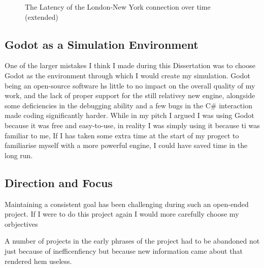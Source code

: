\documentclass[12pt]{article}
\begin{document}
\begin{figure}
\label{fig:Latency London To New York}
\caption{The Latency of the London-New York connection over time (extended)}
\end{figure}


\subsection{Godot as a Simulation Environment}

One of the larger mistakes I think I made during this Dissertation was to choose Godot as the environment through which I would create my simulation. Godot being an open-source software hs little to no impact on the overall quality of my work, and the lack of proper support for the still relativey new engine, alongside some deficiencies in the debugging ability and a few bugs in the C\# interaction made coding significantly harder. While in my pitch I argued I was using Godot because it was free and easy-to-use, in reality I was simply using it because ti was familiar to me, If I has taken some extra time at the start of my progect to familiarise myself with a more powerful engine, I could have saved time in the long run.

\subsection{Direction and Focus}

Maintaining a consistent goal has been challenging during such an open-ended project. If I were to do this project again I would more carefully choose my orbjectives %

A number of projects in the early phrases of the project had to be abandoned not just because of inefficenfiency but because new information came about that rendered hem useless.
\end{document}
